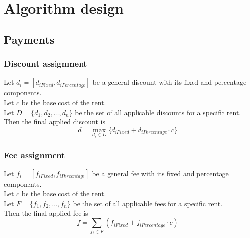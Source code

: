 \section{Algorithm design}
\subsection{Payments}\label{sec:paymentAlgorithms}
\subsubsection{Discount assignment}
Let $d_i=[d_{iFixed},d_{iPercentage}]$ be a general discount with its fixed and percentage components.\\
Let $c$ be the base cost of the rent.\\
Let $D = \lbrace d_1,d_2,\ldots,d_n\rbrace$ be the set of all applicable discounts for a specific rent.\\
Then the final applied discount is $$d = \max_{d_i\in D} \lbrace d_{iFixed}+d_{iPercentage}\cdot c \rbrace$$

\subsubsection{Fee assignment}
Let $f_i=[f_{iFixed},f_{iPercentage}]$ be a general fee with its fixed and percentage components.\\
Let $c$ be the base cost of the rent.\\
Let $F = \lbrace f_1,f_2,\ldots,f_n\rbrace$ be the set of all applicable fees for a specific rent.\\
Then the final applied fee is $$f = \sum_{f_i\in F} ( f_{iFixed} + f_{iPercentage} \cdot c )$$

